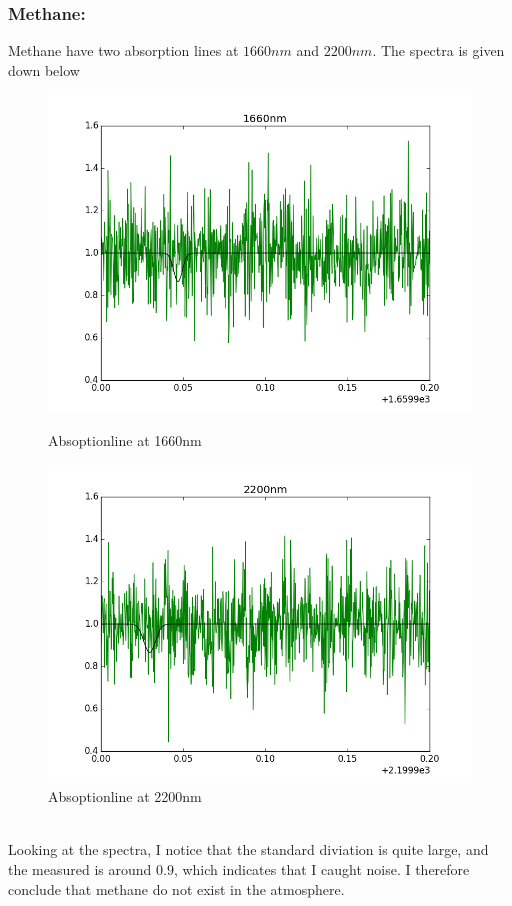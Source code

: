 \documentclass[a4paper,11pt,english]{report}
\begin{document}
\subsubsection{Methane:} Methane have two absorption lines at \(1660nm\) and
\(2200nm\). The spectra is given down below
\begin{figure}[!htb]
  \includegraphics[scale =0.4]{1660nm.png}
  \caption{Absoptionline at 1660nm}
  \endminipage\hfill
  \includegraphics[scale = 0.4]{2200nm.png}
  \caption{Absoptionline at 2200nm}
  \endminipage
\end{figure}
\\
Looking at the spectra, I notice that the standard diviation is quite large,
and the measured is around \(0.9\), which indicates that I caught noise. I
therefore conclude that methane do not exist in the atmosphere.
\end{document}
